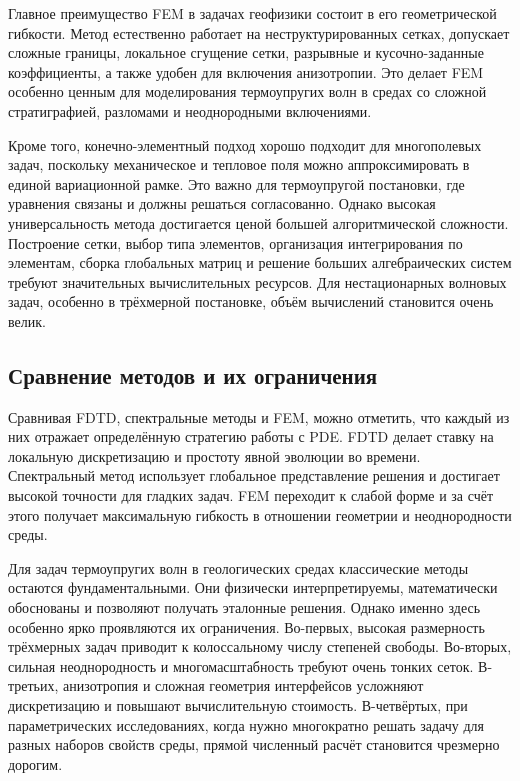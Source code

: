 Главное преимущество FEM в задачах геофизики состоит в его геометрической гибкости. Метод естественно работает на неструктурированных сетках, допускает сложные границы, локальное сгущение сетки, разрывные и кусочно-заданные коэффициенты, а также удобен для включения анизотропии. Это делает FEM особенно ценным для моделирования термоупругих волн в средах со сложной стратиграфией, разломами и неоднородными включениями.

Кроме того, конечно-элементный подход хорошо подходит для многополевых задач, поскольку механическое и тепловое поля можно аппроксимировать в единой вариационной рамке. Это важно для термоупругой постановки, где уравнения связаны и должны решаться согласованно. Однако высокая универсальность метода достигается ценой большей алгоритмической сложности. Построение сетки, выбор типа элементов, организация интегрирования по элементам, сборка глобальных матриц и решение больших алгебраических систем требуют значительных вычислительных ресурсов. Для нестационарных волновых задач, особенно в трёхмерной постановке, объём вычислений становится очень велик.

\subsection*{Сравнение методов и их ограничения}

Сравнивая FDTD, спектральные методы и FEM, можно отметить, что каждый из них отражает определённую стратегию работы с PDE. FDTD делает ставку на локальную дискретизацию и простоту явной эволюции во времени. Спектральный метод использует глобальное представление решения и достигает высокой точности для гладких задач. FEM переходит к слабой форме и за счёт этого получает максимальную гибкость в отношении геометрии и неоднородности среды.

Для задач термоупругих волн в геологических средах классические методы остаются фундаментальными. Они физически интерпретируемы, математически обоснованы и позволяют получать эталонные решения. Однако именно здесь особенно ярко проявляются их ограничения. Во-первых, высокая размерность трёхмерных задач приводит к колоссальному числу степеней свободы. Во-вторых, сильная неоднородность и многомасштабность требуют очень тонких сеток. В-третьих, анизотропия и сложная геометрия интерфейсов усложняют дискретизацию и повышают вычислительную стоимость. В-четвёртых, при параметрических исследованиях, когда нужно многократно решать задачу для разных наборов свойств среды, прямой численный расчёт становится чрезмерно дорогим.

